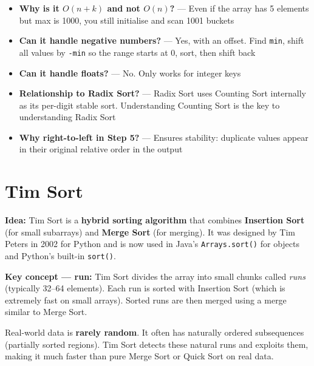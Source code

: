 \documentclass[12pt,a4paper,oneside]{book}
\begin{document}
\begin{interviewcorner}
\begin{itemize}
  \item \textbf{Why is it $O(n + k)$ and not $O(n)$?} --- Even if the array has 5 elements but max is 1000, you still initialise and scan 1001 buckets
  \item \textbf{Can it handle negative numbers?} --- Yes, with an offset. Find \texttt{min}, shift all values by \texttt{-min} so the range starts at 0, sort, then shift back
  \item \textbf{Can it handle floats?} --- No. Only works for integer keys
  \item \textbf{Relationship to Radix Sort?} --- Radix Sort uses Counting Sort internally as its per-digit stable sort. Understanding Counting Sort is the key to understanding Radix Sort
  \item \textbf{Why right-to-left in Step 5?} --- Ensures stability: duplicate values appear in their original relative order in the output
\end{itemize}
\end{interviewcorner}

\section{Tim Sort}

\textbf{Idea:} Tim Sort is a \textbf{hybrid sorting algorithm} that combines \textbf{Insertion Sort} (for small subarrays) and \textbf{Merge Sort} (for merging). It was designed by Tim Peters in 2002 for Python and is now used in Java's \texttt{Arrays.sort()} for objects and Python's built-in \texttt{sort()}.

\textbf{Key concept --- run:} Tim Sort divides the array into small chunks called \textit{runs} (typically 32--64 elements). Each run is sorted with Insertion Sort (which is extremely fast on small arrays). Sorted runs are then merged using a merge similar to Merge Sort.

\begin{definitionbox}
Real-world data is \textbf{rarely random}. It often has naturally ordered subsequences (partially sorted regions). Tim Sort detects these natural runs and exploits them, making it much faster than pure Merge Sort or Quick Sort on real data.
\end{definitionbox}
\end{document}
